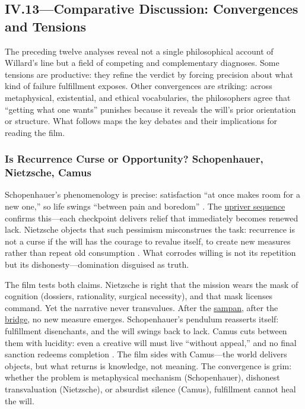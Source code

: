 \subsection*{IV.13—Comparative Discussion: Convergences and Tensions}
\label{ssec:iv-comparative-discussion}

The preceding twelve analyses reveal not a single philosophical account of Willard's line but
a field of competing and complementary diagnoses. Some tensions are productive: they refine
the verdict by forcing precision about what kind of failure fulfillment exposes. Other
convergences are striking: across metaphysical, existential, and ethical vocabularies, the
philosophers agree that ``getting what one wants'' punishes because it reveals the will's
prior orientation or structure. What follows maps the key debates and their implications for
reading the film.

\subsubsection*{Is Recurrence Curse or Opportunity? Schopenhauer, Nietzsche, Camus}

Schopenhauer's phenomenology is precise: satisfaction ``at once makes room for a new one,'' so
life swings ``between pain and boredom'' \parencite[pp.~312, 319]{SchopenhauerWWR1969}. The
\hyperref[scene:upriver-journey]{upriver sequence} confirms this---each checkpoint delivers
relief that immediately becomes renewed lack. Nietzsche objects that such pessimism
misconstrues the task: recurrence is not a curse if the will has the courage to revalue
itself, to create new measures rather than repeat
old consumption \parencite[\S\S 34, 283]{NietzscheBGE1990}. What corrodes willing is not its
repetition but its dishonesty---domination disguised as truth.

The film tests both claims. Nietzsche is right that the mission wears the mask of cognition
(dossiers, rationality, surgical necessity), and that mask licenses command. Yet the narrative
never transvalues. After the \hyperref[scene:sampan]{sampan}, after the
\hyperref[scene:do-lung-bridge]{bridge}, no new measure emerges. Schopenhauer's
pendulum reasserts itself: fulfillment disenchants, and the will swings back to lack. Camus
cuts between them with lucidity: even a creative will must live ``without appeal,'' and no
final sanction redeems completion \parencite[pp.~28, 54, 121--123]{CamusMyth1991}. The film
sides with Camus---the world delivers objects, but what returns is knowledge, not meaning. The
convergence is grim: whether the problem is metaphysical mechanism (Schopenhauer), dishonest
transvaluation (Nietzsche), or absurdist silence (Camus), fulfillment cannot heal the will.

